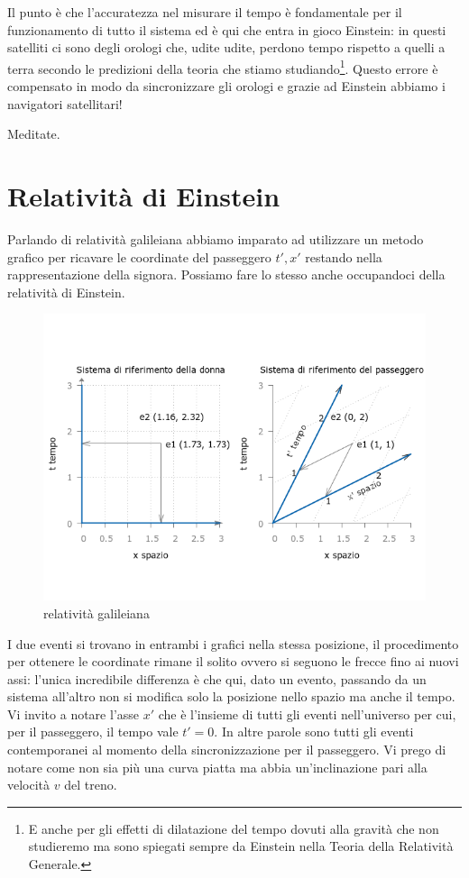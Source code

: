 Il punto è che l'accuratezza nel misurare il tempo è fondamentale per il funzionamento di tutto il sistema ed è qui che entra in gioco Einstein: in questi satelliti ci sono degli orologi che, udite udite, perdono tempo rispetto a quelli a terra secondo le predizioni della teoria che stiamo studiando\footnote {E anche per gli effetti di dilatazione del tempo dovuti alla gravità che non studieremo ma sono spiegati sempre da Einstein nella Teoria della Relatività Generale.}. Questo errore è compensato in modo da sincronizzare gli orologi e grazie ad Einstein abbiamo i navigatori satellitari! 

Meditate.

\section{Relatività di Einstein}

Parlando di relatività galileiana abbiamo imparato ad utilizzare un metodo grafico per ricavare le coordinate del passeggero $t',x'$ restando nella rappresentazione della signora. Possiamo fare lo stesso anche occupandoci della relatività di Einstein.


\begin{figure}[h!]
 \centering
 \includegraphics[scale=0.7]{figure/fig10}
 \caption{relatività galileiana}
\end{figure}

I due eventi si trovano in entrambi i grafici nella stessa posizione, il procedimento per ottenere le coordinate rimane il solito ovvero si seguono le frecce fino ai nuovi assi: l'unica incredibile differenza è che qui, dato un evento, passando da un sistema all'altro non si modifica solo la posizione nello spazio ma anche il tempo. Vi invito a notare l'asse $x'$ che è l'insieme di tutti gli eventi nell'universo per cui, per il passeggero, il tempo vale $t'=0$. In altre parole sono tutti gli eventi contemporanei al momento della sincronizzazione per il passeggero. Vi prego di notare come non sia più una curva piatta ma abbia un'inclinazione pari alla velocità $v$ del treno.

